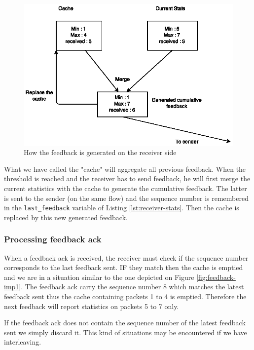 \begin{figure}[!ht]
\centering
\includegraphics[width=\textwidth]{images/Feedback-implem3.eps}
\caption{How the feedback is generated on the receiver side}
\label{fig:feedback-imp3}
\end{figure}

What we have called the "cache" will aggregate all previous feedback. When the threshold is reached and the receiver has to send feedback, he will first merge the current statistics with the cache to generate the cumulative feedback. The latter is sent to the sender (on the same flow) and the sequence number is remembered in the \texttt{last\_feedback} variable of Listing \ref{lst:receiver-stats}. Then the cache is replaced by this new generated feedback.


\subsubsection{Processing feedback ack}

When a feedback ack is received, the receiver must check if the sequence number corresponds to the last feedback sent. IF they match then the cache is emptied and we are in a situation similar to the one depicted on Figure \ref{fig:feedback-imp1}. The feedback ack carry the sequence number 8 which matches the latest feedback sent thus the cache containing packets 1 to 4 is emptied. Therefore the next feedback will report statistics on packets 5 to 7 only.

If the feedback ack does not contain the sequence number of the latest feedback sent we simply discard it. This kind of situations may be encountered if we have interleaving. 


